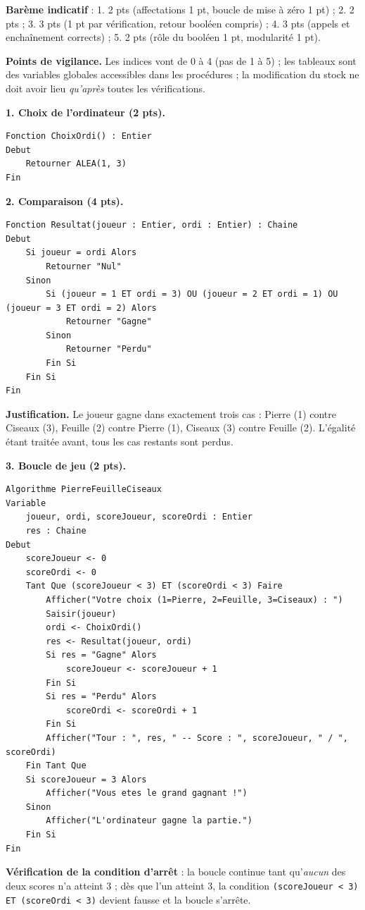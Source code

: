 \documentclass[11pt]{article}
\begin{document}
\begin{corrige}
\textbf{Barème indicatif} : 1. 2 pts (affectations 1 pt, boucle de mise à zéro 1 pt) ; 2. 2 pts ; 3. 3 pts (1 pt par vérification, retour booléen compris) ; 4. 3 pts (appels et enchaînement corrects) ; 5. 2 pts (rôle du booléen 1 pt, modularité 1 pt).

\textbf{Points de vigilance.} Les indices vont de 0 à 4 (pas de 1 à 5) ; les tableaux sont des variables globales accessibles dans les procédures ; la modification du stock ne doit avoir lieu \emph{qu'après} toutes les vérifications.
\end{corrige}

\begin{corrige}
\textbf{1. Choix de l'ordinateur (2 pts).}
\begin{lstlisting}
Fonction ChoixOrdi() : Entier
Debut
    Retourner ALEA(1, 3)
Fin
\end{lstlisting}

\textbf{2. Comparaison (4 pts).}
\begin{lstlisting}
Fonction Resultat(joueur : Entier, ordi : Entier) : Chaine
Debut
    Si joueur = ordi Alors
        Retourner "Nul"
    Sinon
        Si (joueur = 1 ET ordi = 3) OU (joueur = 2 ET ordi = 1) OU (joueur = 3 ET ordi = 2) Alors
            Retourner "Gagne"
        Sinon
            Retourner "Perdu"
        Fin Si
    Fin Si
Fin
\end{lstlisting}
\textbf{Justification.} Le joueur gagne dans exactement trois cas : Pierre (1) contre Ciseaux (3), Feuille (2) contre Pierre (1), Ciseaux (3) contre Feuille (2). L'égalité étant traitée avant, tous les cas restants sont perdus.

\textbf{3. Boucle de jeu (2 pts).}
\begin{lstlisting}
Algorithme PierreFeuilleCiseaux
Variable
    joueur, ordi, scoreJoueur, scoreOrdi : Entier
    res : Chaine
Debut
    scoreJoueur <- 0
    scoreOrdi <- 0
    Tant Que (scoreJoueur < 3) ET (scoreOrdi < 3) Faire
        Afficher("Votre choix (1=Pierre, 2=Feuille, 3=Ciseaux) : ")
        Saisir(joueur)
        ordi <- ChoixOrdi()
        res <- Resultat(joueur, ordi)
        Si res = "Gagne" Alors
            scoreJoueur <- scoreJoueur + 1
        Fin Si
        Si res = "Perdu" Alors
            scoreOrdi <- scoreOrdi + 1
        Fin Si
        Afficher("Tour : ", res, " -- Score : ", scoreJoueur, " / ", scoreOrdi)
    Fin Tant Que
    Si scoreJoueur = 3 Alors
        Afficher("Vous etes le grand gagnant !")
    Sinon
        Afficher("L'ordinateur gagne la partie.")
    Fin Si
Fin
\end{lstlisting}
\textbf{Vérification de la condition d'arrêt} : la boucle continue tant qu'\emph{aucun} des deux scores n'a atteint 3 ; dès que l'un atteint 3, la condition \texttt{(scoreJoueur < 3) ET (scoreOrdi < 3)} devient fausse et la boucle s'arrête.


\end{corrige}
\end{document}
